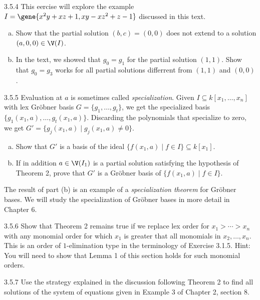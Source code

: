 \documentclass[twoside]{article}
\begin{document}
\newpage

\begin{ejercicio}{3.5.4}
This eercise will explore the example $I = \gene{x^2y+xz+1, xy-xz^2+z-1}$ discussed in this text.
\begin{enumerate}[a.]
\item Show that the partial solution $(b,c) = (0,0)$ does not extend to a solution $(a,0,0) \in \V(I)$.
\item In the text, we showed that $g_0 = g_1$ for the partial solution $(1,1)$.
Show that $g_0 = g_3$ works for all partial solutions differrent from $(1,1)$ and $(0,0)$.
\end{enumerate}
\end{ejercicio}

\newpage

\begin{ejercicio}{3.5.5}
Evaluation at $a$ is sometimes called \emph{specialization}.
Given $I \subseteq k[x_1,\dots,x_n]$ with lex Gröbner basis $G = \{g_1,\dots,g_t\}$, we get the specialized basis $\{g_1(x_1,a),\dots,g_t(x_1,a)\}$.
Discarding the polynomials that specialize to zero, we get $G' = \{g_j(x_1,a) \mid g_j(x_1,a) \neq 0\}$.
\begin{enumerate}[a.]
\item Show that $G'$ is a basis of the ideal $\{f(x_1,a) \mid f \in I\} \subseteq k[x_1]$.
\item If in addition $a \in \V(I_1)$ is a partial solution satisfying the hypothesis of Theorem 2, prove that $G'$ is a Gröbner basis of $\{f(x_1,a) \mid f \in I\}$.
\end{enumerate}
The result of part (b) is an example of a \emph{specialization theorem} for Gröbner bases.
We will study the specialization of Gröbner bases in more detail in Chapter 6.
\end{ejercicio}

\newpage

\begin{ejercicio}{3.5.6}
Show that Theorem 2 remains true if we replace lex order for $x_1 > \cdots > x_n$ with any monomial order for which $x_1$ is greater that all monomials in $x_2,\dots,x_n$.
This is an order of $1$-elimination type in the terminology of Exercise 3.1.5.
Hint: You will need to show that Lemma 1 of this section holds for such monomial orders.
\end{ejercicio}

\newpage

\begin{ejercicio}{3.5.7}
Use the strategy explained in the discussion following Theorem 2 to find all solutions of the system of equations given in Example 3 of Chapter 2, section 8.
\end{ejercicio}
\end{document}
